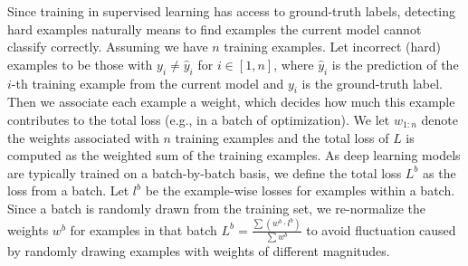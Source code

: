 \begin{algorithm}[!pt]
{    %
    }
\end{algorithm}

Since training in supervised learning has access to ground-truth labels, detecting hard examples naturally means to find examples the current model cannot classify correctly.
Assuming we have $n$ training examples.
Let incorrect (hard) examples to be those with $y_{i}\neq \hat{y}_{i}$ for $i \in [1, n]$, where $\hat{y}_{i}$ is the prediction of the $i$-th training example from the current model and $y_{i}$ is the ground-truth label.
Then we associate each example a weight, which decides how much this example contributes to the total loss (e.g., in a batch of optimization).
We let $w_{1:n}$ denote the weights associated with $n$ training examples and the total loss of $L$ is computed as the weighted sum of the training examples. 
As deep learning models are typically trained on a batch-by-batch basis, we define the total loss $L^b$ as the loss from a batch.
Let $l^b$ be the example-wise losses for examples within a batch. 
Since a batch is randomly drawn from the training set, we re-normalize the weights $w^b$ for examples in that batch $L^b=\frac{\sum(w^b \cdot l^b)} {\sum w^b}$ to avoid fluctuation caused by randomly drawing examples with weights of different magnitudes.

